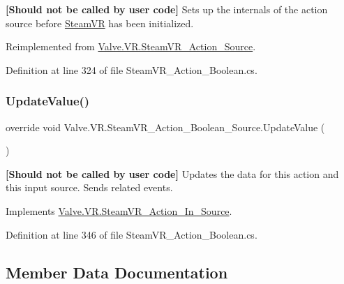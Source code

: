{\bfseries{\mbox{[}Should not be called by user code\mbox{]}}} Sets up the internals of the action source before \mbox{\hyperlink{class_valve_1_1_v_r_1_1_steam_v_r}{Steam\+VR}} has been initialized. 



Reimplemented from \mbox{\hyperlink{class_valve_1_1_v_r_1_1_steam_v_r___action___source_aa2bec7f32b37595de01f1456a3fa5bfe}{Valve.\+V\+R.\+Steam\+V\+R\+\_\+\+Action\+\_\+\+Source}}.



Definition at line 324 of file Steam\+V\+R\+\_\+\+Action\+\_\+\+Boolean.\+cs.

\mbox{\label{class_valve_1_1_v_r_1_1_steam_v_r___action___boolean___source_a3a48e22c9912f24ad65e3b64a21cc54c}} 
\subsubsection{\texorpdfstring{UpdateValue()}{UpdateValue()}}
{\footnotesize\ttfamily override void Valve.\+V\+R.\+Steam\+V\+R\+\_\+\+Action\+\_\+\+Boolean\+\_\+\+Source.\+Update\+Value (\begin{DoxyParamCaption}{ }\end{DoxyParamCaption})\hspace{0.3cm}{\ttfamily [virtual]}}



{\bfseries{\mbox{[}Should not be called by user code\mbox{]}}} Updates the data for this action and this input source. Sends related events. 



Implements \mbox{\hyperlink{class_valve_1_1_v_r_1_1_steam_v_r___action___in___source_a800b521715c6cbfe32e9b0b6db7e0a16}{Valve.\+V\+R.\+Steam\+V\+R\+\_\+\+Action\+\_\+\+In\+\_\+\+Source}}.



Definition at line 346 of file Steam\+V\+R\+\_\+\+Action\+\_\+\+Boolean.\+cs.



\subsection{Member Data Documentation}
\mbox{\label{class_valve_1_1_v_r_1_1_steam_v_r___action___boolean___source_a548a08fed0cbd805a41b5c8fb6781ec7}} 
